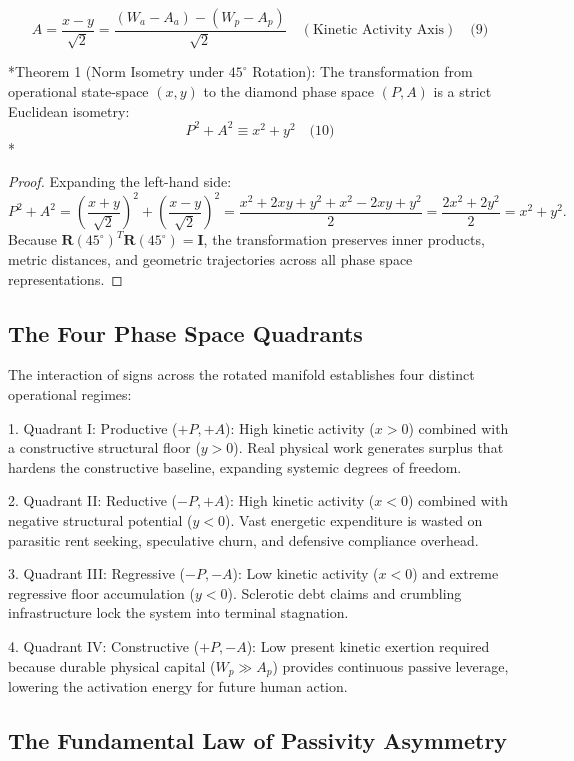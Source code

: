\documentclass[preprint,12pt,authoryear]{elsarticle}
\theoremstyle{definition}
\begin{document}
$$A = \frac{x - y}{\sqrt{2}} = \frac{(W_a - A_a) - (W_p - A_p)}{\sqrt{2}} \quad ( \text{Kinetic Activity Axis}) \quad \text{(9)}$$

*Theorem 1 (Norm Isometry under $45^\circ$ Rotation):\textit{ }The transformation from operational state-space $(x, y)$ to the diamond phase space $(P, A)$ is a strict Euclidean isometry: $$P^2 + A^2 \equiv x^2 + y^2 \quad \text{(10)}$$*

\begin{proof} Expanding the left-hand side: $$P^2 + A^2 = \left( \frac{x+y}{\sqrt{2}} \right)^2 + \left( \frac{x-y}{\sqrt{2}} \right)^2 = \frac{x^2 + 2xy + y^2 + x^2 - 2xy + y^2}{2} = \frac{2x^2 + 2y^2}{2} = x^2 + y^2.$$ Because $\mathbf{R}(45^\circ)^T \mathbf{R}(45^\circ) = \mathbf{I}$, the transformation preserves inner products, metric distances, and geometric trajectories across all phase space representations. \end{proof}

\subsection{The Four Phase Space Quadrants}

The interaction of signs across the rotated manifold establishes four distinct operational regimes:

1. Quadrant I: Productive ($+P, +A$): High kinetic activity ($x > 0$) combined with a constructive structural floor ($y > 0$). Real physical work generates surplus that hardens the constructive baseline, expanding systemic degrees of freedom.

2. Quadrant II: Reductive ($-P, +A$): High kinetic activity ($x < 0$) combined with negative structural potential ($y < 0$). Vast energetic expenditure is wasted on parasitic rent seeking, speculative churn, and defensive compliance overhead.

3. Quadrant III: Regressive ($-P, -A$): Low kinetic activity ($x < 0$) and extreme regressive floor accumulation ($y < 0$). Sclerotic debt claims and crumbling infrastructure lock the system into terminal stagnation.

4. Quadrant IV: Constructive ($+P, -A$): Low present kinetic exertion required because durable physical capital ($W_p \gg A_p$) provides continuous passive leverage, lowering the activation energy for future human action.

\subsection{The Fundamental Law of Passivity Asymmetry}
\end{document}

